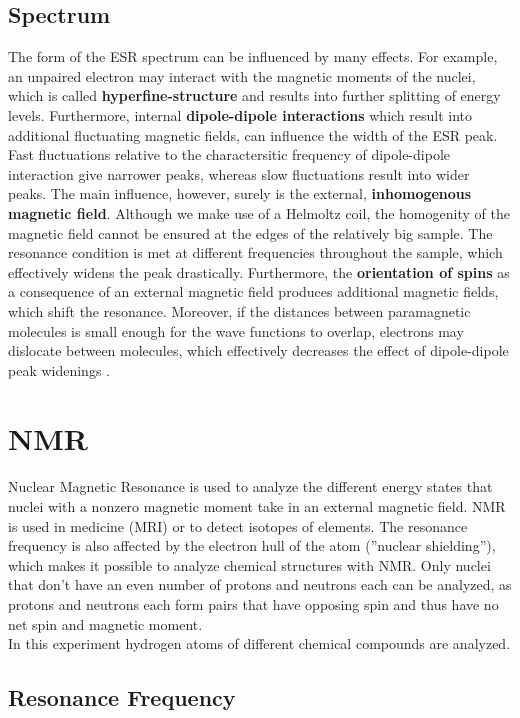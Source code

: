 \subsection{Spectrum}
The form of the ESR spectrum can be influenced by many effects.
For example, an unpaired electron may interact with the magnetic moments of the nuclei, which is called \textbf{hyperfine-structure} and results into further splitting of energy levels.
Furthermore, internal \textbf{dipole-dipole interactions} which result into additional fluctuating magnetic fields, can influence the width of the ESR peak.
Fast fluctuations relative to the charactersitic frequency of dipole-dipole interaction give narrower peaks, whereas slow fluctuations result into wider peaks.
The main influence, however, surely is the external, \textbf{inhomogenous magnetic field}.
Although we make use of a Helmoltz coil, the homogenity of the magnetic field cannot be ensured at the edges of the relatively big sample.
The resonance condition is met at different frequencies throughout the sample, which effectively widens the peak drastically.
Furthermore, the \textbf{orientation of spins} as a consequence of an external magnetic field produces additional magnetic fields, which shift the resonance.
Moreover, if the distances between paramagnetic molecules is small enough for the wave functions to overlap, electrons may dislocate between molecules, which effectively decreases the effect of dipole-dipole peak widenings \cite{lab-inst}.

\section{NMR}
Nuclear Magnetic Resonance is used to analyze the different energy states that nuclei with a nonzero magnetic moment take in an external magnetic field.
NMR is used in medicine (MRI) or to detect isotopes of elements.
The resonance frequency is also affected by the electron hull of the atom (''nuclear shielding''), which makes it possible to analyze chemical structures with NMR.
Only nuclei that don't have an even number of protons and neutrons each can be analyzed, as protons and neutrons each form pairs that have opposing spin and thus have no net spin and magnetic moment.\\
In this experiment hydrogen atoms of different chemical compounds are analyzed.

\subsection{Resonance Frequency}

